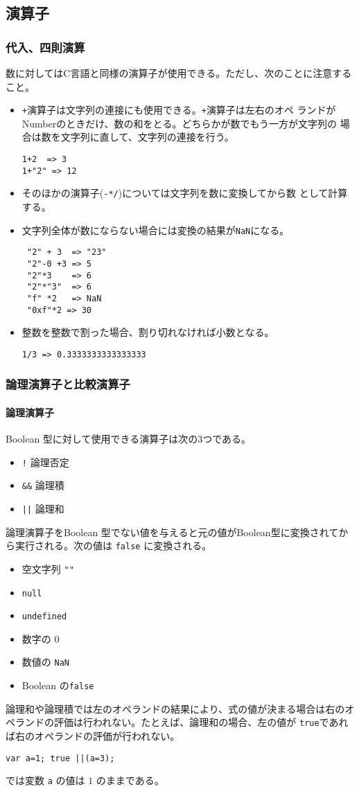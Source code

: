 \documentclass[a4j]{jarticle}
\begin{document}
\subsection{演算子}
\subsubsection{代入、四則演算}
数に対してはC言語と同様の演算子が使用できる。ただし、次のことに注意する
こと。
\begin{itemize}
 \item \verb-+-演算子は文字列の連接にも使用できる。\verb-+-演算子は左右のオペ
ランドがNumberのときだけ、数の和をとる。どちらかが数でもう一方が文字列の
場合は数を文字列に直して、文字列の連接を行う。
\begin{Verbatim}
1+2  => 3
1+"2" => 12
\end{Verbatim}
 \item そのほかの演算子(\verb+-*/+)については文字列を数に変換してから数
       として計算する。
 \item 文字列全体が数にならない場合には変換の結果が\verb+NaN+になる。
\begin{Verbatim}
 "2" + 3  => "23"
 "2"-0 +3 => 5
 "2"*3    => 6
 "2"*"3"  => 6
 "f" *2   => NaN
 "0xf"*2 => 30
\end{Verbatim}
 \item 整数を整数で割った場合、割り切れなければ小数となる。
\begin{Verbatim}
1/3 => 0.3333333333333333
\end{Verbatim}
\end{itemize}
\subsubsection{論理演算子と比較演算子}
\paragraph{論理演算子}
Boolean 型に対して使用できる演算子は次の3つである。
\begin{itemize}
 \item \verb+!+ 論理否定
 \item \verb+&&+ 論理積
 \item \verb+||+ 論理和
\end{itemize}
論理演算子をBoolean 型でない値を与えると元の値がBoolean型に変換されてか
ら実行される。次の値は \verb+false+ に変換される。
\begin{itemize}
 \item 空文字列 \verb+""+
 \item \verb+null+
 \item \verb+undefined+
 \item 数字の $0$
 \item 数値の \verb+NaN+
 \item Boolean の\verb+false+
\end{itemize}
論理和や論理積では左のオペランドの結果により、式の値が決まる場合は右のオ
ペランドの評価は行われない。たとえば、論理和の場合、左の値が
\verb+true+であれば右のオペランドの評価が行われない。
\begin{Verbatim}
var a=1; true ||(a=3); 
\end{Verbatim}
では変数 \verb+a+ の値は $1$ のままである。
\end{document}
